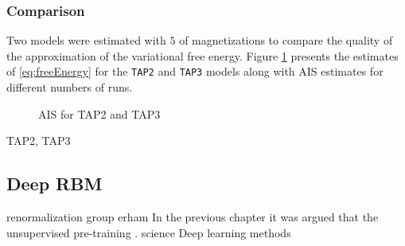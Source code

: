 \documentclass[../report/report.tex]{subfiles}
\begin{document}
\subsubsection{Comparison}
Two models were estimated with $5$ of magnetizations to compare the quality of the approximation of the variational free energy. Figure \ref{fig:AISTAP2} presents the estimates of \ref{eq:freeEnergy} for the \verb|TAP2| and \verb|TAP3| models along with AIS estimates for different numbers of runs.

\begin{figure}[!htb]
\label{fig:AISTAP2}
  \caption[1]{AIS for TAP2 and TAP3}
\end{figure}
TAP2, TAP3


\subsection{Deep RBM}
renormalization group
erham
In the previous chapter it was argued that the unsupervised pre-training . 
science
Deep learning methods
\end{document}

